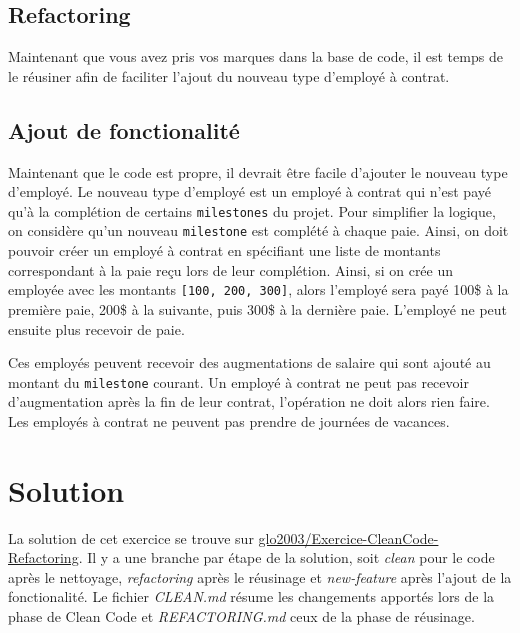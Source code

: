 \documentclass[french]{article}
\begin{document}
\subsection{Refactoring}

Maintenant que vous avez pris vos marques dans la base de code, il est temps de le réusiner afin de faciliter l'ajout du nouveau type d'employé à contrat.


\subsection{Ajout de fonctionalité}

Maintenant que le code est propre, il devrait être facile d'ajouter le nouveau type d'employé. Le nouveau type d'employé est un employé à contrat qui n'est payé qu'à la complétion de certains \texttt{milestones} du projet. Pour simplifier la logique, on considère qu'un nouveau \texttt{milestone} est complété à chaque paie. Ainsi, on doit pouvoir créer un employé à contrat en spécifiant une liste de montants correspondant à la paie reçu lors de leur complétion. Ainsi, si on crée un employée avec les montants \texttt{[100, 200, 300]}, alors l'employé sera payé 100\$ à la première paie, 200\$ à la suivante, puis 300\$ à la dernière paie. L'employé ne peut ensuite plus recevoir de paie.

Ces employés peuvent recevoir des augmentations de salaire qui sont ajouté au montant du \texttt{milestone} courant. Un employé à contrat ne peut pas recevoir d'augmentation après la fin de leur contrat, l'opération ne doit alors rien faire. Les employés à contrat ne peuvent pas prendre de journées de vacances.

\section{Solution}
La solution de cet exercice se trouve sur \href{https://github.com/glo2003/Exercice-CleanCode-Refactoring}{glo2003/Exercice-CleanCode-Refactoring}. Il y a une branche par étape de la solution, soit \textit{clean} pour le code après le nettoyage, \textit{refactoring} après le réusinage et \textit{new-feature} après l'ajout de la fonctionalité. Le fichier \textit{CLEAN.md} résume les changements apportés lors de la phase de Clean Code et \textit{REFACTORING.md} ceux de la phase de réusinage.



\end{document}
